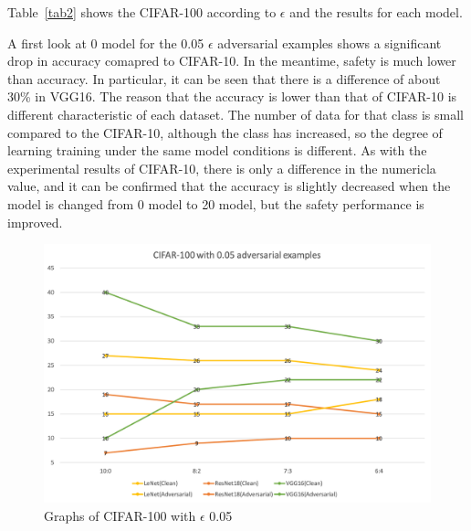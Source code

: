 \documentclass[journal,article,submit,moreauthors,pdftex]{Definitions/mdpi}
\begin{document}
Table~\ref{tab2} shows the CIFAR-100 according to \begin{math}\epsilon\end{math} and the results for each model.

A first look at 0 model for the 0.05 \begin{math}\epsilon\end{math} adversarial examples shows a significant drop in accuracy comapred to CIFAR-10.
In the meantime, safety is much lower than accuracy. In particular, it can be seen that there is a difference of about 30\% in VGG16.
The reason that the accuracy is lower than that of CIFAR-10 is different characteristic of each dataset. The number of data for that class is small compared to the CIFAR-10, although the class has increased, so the degree of learning training under the same model conditions is different.
As with the experimental results of CIFAR-10, there is only a difference in the numericla value, and it can be confirmed that the accuracy is slightly decreased when the model is changed from 0 model to 20 model, but the safety performance is improved. 

\begin{figure}[H]
    \includegraphics[width=13 cm]{Definitions/graph-005cifar100.png}
    \caption{Graphs of CIFAR-100 with \begin{math}\epsilon\end{math} 0.05\label{graph3}}
\end{figure} 
\end{document}
